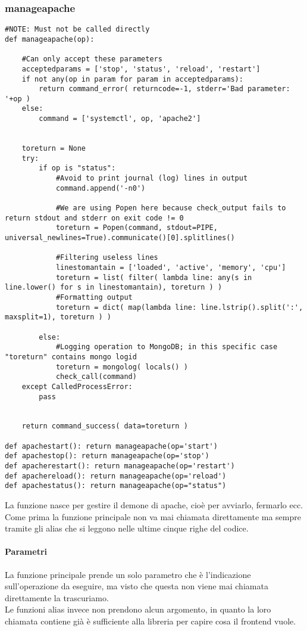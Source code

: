 \documentclass[11pt]{article}
\begin{document}
\subsubsection{manageapache}\label{manageapache}
\begin{lstlisting}
#NOTE: Must not be called directly
def manageapache(op):
    
    #Can only accept these parameters
    acceptedparams = ['stop', 'status', 'reload', 'restart']
    if not any(op in param for param in acceptedparams):
        return command_error( returncode=-1, stderr='Bad parameter: '+op )
    else:
        command = ['systemctl', op, 'apache2']


    toreturn = None
    try:
        if op is "status":
            #Avoid to print journal (log) lines in output
            command.append('-n0')

            #We are using Popen here because check_output fails to return stdout and stderr on exit code != 0
            toreturn = Popen(command, stdout=PIPE, universal_newlines=True).communicate()[0].splitlines()

            #Filtering useless lines
            linestomantain = ['loaded', 'active', 'memory', 'cpu']
            toreturn = list( filter( lambda line: any(s in line.lower() for s in linestomantain), toreturn ) )
            #Formatting output
            toreturn = dict( map(lambda line: line.lstrip().split(':', maxsplit=1), toreturn ) )

        else:
            #Logging operation to MongoDB; in this specific case "toreturn" contains mongo logid
            toreturn = mongolog( locals() )
            check_call(command)
    except CalledProcessError:
        pass


    return command_success( data=toreturn )

def apachestart(): return manageapache(op='start')
def apachestop(): return manageapache(op='stop')
def apacherestart(): return manageapache(op='restart')
def apachereload(): return manageapache(op='reload')
def apachestatus(): return manageapache(op="status")
\end{lstlisting}
La funzione nasce per gestire il demone di apache, cioè per avviarlo, fermarlo ecc. Come prima la funzione principale non va
mai chiamata direttamente ma sempre tramite gli alias che si leggono nelle ultime cinque righe del codice.
\paragraph{Parametri}
La funzione principale prende un solo parametro che è l'indicazione sull'operazione da eseguire, ma visto che questa non viene
mai chiamata direttamente la trascuriamo.\\
Le funzioni alias invece non prendono alcun argomento, in quanto la loro chiamata contiene già è sufficiente alla libreria
per capire cosa il frontend vuole.
\end{document}
